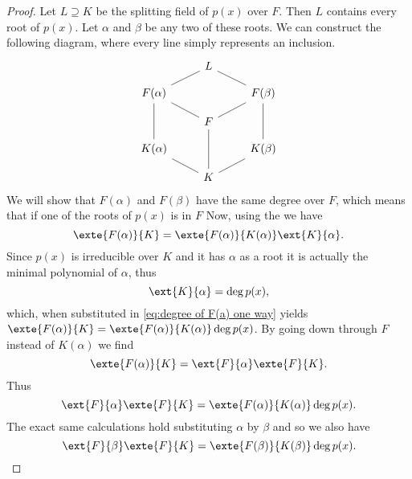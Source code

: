\documentclass[12pt,oneside]{book}
\begin{document}
\begin{proof}
	Let \( L \supseteq K \) be the splitting field of \( p(x) \) over \( F \). Then \( L \)
	contains every	root of \( p(x) \). Let \( \alpha \) and \( \beta \) be any two of these
	roots. We can	construct the following	diagram, where every line simply represents an
	inclusion.
	\begin{equation*}
		\begin{tikzcd}[row sep=small]
		& L &  \\
			F(\alpha) \arrow[ru, dash] & & F(\beta) \arrow[lu, dash] \\
																 & F \arrow[lu, dash] \arrow[ru, dash] & \\
			K(\alpha) \arrow[uu, dash] & & K(\beta) \arrow[uu, dash] \\
																 & K \arrow[uu, dash] \arrow[ru, dash] \arrow[lu, dash] &
		\end{tikzcd}
	\end{equation*}
	We will show that \( F(\alpha) \) and \( F(\beta) \) have the same degree over \( F \),
	which means that if one of the roots of \( p(x) \) is in \( F \)
	Now, using the  we have
	\begin{equation}\label{eq:degree of F(a) one way}
		\exte{F(\alpha)}{K} = \exte{F(\alpha)}{K(\alpha)}\ext{K}{\alpha}.
	\end{equation}
	Since \( p(x) \) is irreducible over \( K \) and it has \( \alpha \) as a root it is
	actually the minimal polynomial of \( \alpha \), thus
	\begin{equation*}
		\ext{K}{\alpha} = \deg{p(x)},
	\end{equation*}
	which, when substituted in \cref{eq:degree of F(a) one way} yields \(
	\exte{F(\alpha)}{K} = \exte{F(\alpha)}{K(\alpha)}\deg{p(x)} \). By going down through \(
	F\) instead of \( K(\alpha) \) we find
	\begin{equation*}
		\exte{F(\alpha)}{K} = \ext{F}{\alpha} \exte{F}{K}.
	\end{equation*}
	Thus
	\begin{equation} \label{eq:degree of F(a) both ways}
		\ext{F}{\alpha} \exte{F}{K} = \exte{F(\alpha)}{K(\alpha)} \deg{p(x)}.
	\end{equation}
	The exact same calculations hold substituting \( \alpha \) by \( \beta \) and so we also
	have
	\begin{equation} \label{eq:degree of F(b) both ways}
		\ext{F}{\beta} \exte{F}{K} = \exte{F(\beta)}{K(\beta)} \deg{p(x)}.
	\end{equation}


\end{proof}
\end{document}
